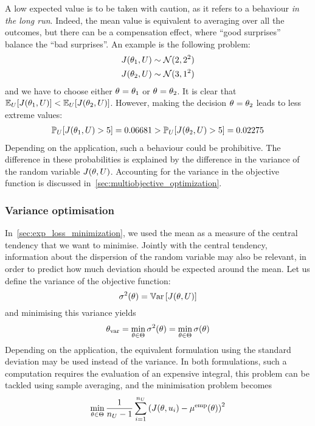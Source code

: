 \documentclass[../../Main_ManuscritThese.tex]{subfiles}
\begin{document}
A low expected value is to be taken with caution, as it refers to a
behaviour \emph{in the long run}. Indeed, the mean value is equivalent
to averaging over all the outcomes, but there can be a compensation
effect, where ``good surprises'' balance the ``bad surprises''.  An
example is the following problem:
\begin{align}
  J(\theta_1, U) &\sim \mathcal{N}(2, 2^2) \\
  J(\theta_2, U) & \sim \mathcal{N}(3, 1^2)
\end{align}
and we have to choose either ${\theta}_{\mathrm{}}=\theta_1$ or
${\theta}_{\mathrm{}} = \theta_2$.  It is clear that
$\mathbb{E}_{U}[J(\theta_1, U)] < \mathbb{E}_{U}[J(\theta_2, U)]$. However, making
the decision ${\theta}_{\mathrm{}} = \theta_2$ leads to less extreme values:
\begin{align}
  \mathbb{P}_{U}[J(\theta_1, U) > 5] = 0.06681> \mathbb{P}_{U}[J(\theta_2, U) > 5] = 0.02275
\end{align}
Depending on the application, such a behaviour could be prohibitive.
The difference in these probabilities is explained by the difference
in the variance of the random variable $J(\theta, U)$.  Accounting for
the variance in the objective function is discussed
in~\cref{sec:multiobjective_optimization}.

\subsubsection{Variance optimisation}
In~\cref{sec:exp_loss_minimization}, we used the mean as a measure of
the central tendency that we want to minimise. Jointly with the
central tendency, information about the dispersion of the random
variable may also be relevant, in order to predict how much deviation
should be expected around the mean.  Let us define the variance of the
objective function:
\begin{equation}
  \sigma^2(\theta) = \mathbb{V}\mathrm{ar}\left[J(\theta,U)\right]
\end{equation}
and minimising this variance yields
\begin{equation}
  {\theta}_{\mathrm{var}} = \min_{\theta \in \Theta} \sigma^2(\theta) =  \min_{\theta \in \Theta} \sigma(\theta)
\end{equation}
Depending on the application, the equivalent formulation using the
standard deviation may be used instead of the variance. In both
formulations, such a computation requires the evaluation
of an expensive integral, this problem can be tackled using sample
averaging, and the minimisation problem becomes
\begin{equation}
  \min_{\theta\in \Theta} \frac{1}{n_{U}-1} \sum_{i=1}^{n_{U}} \left(J(\theta, u_i) - \mu^{\mathrm{emp}}(\theta)\right)^2
\end{equation}
\end{document}
